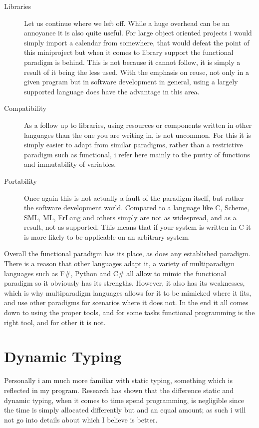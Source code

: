 \documentclass[11pt,a4paper,article,oneside]{memoir}
\begin{document}
\begin{description}
    \item [Libraries]
    Let us continue where we left off.
    While a huge overhead can be an annoyance it is also quite useful.
    For large object oriented projects i would simply import a calendar from somewhere, that would defeat the point of this miniproject but when it comes to library support the functional paradigm is behind.
    This is not because it cannot follow, it is simply a result of it being the less used.
    With the emphasis on reuse, not only in a given program but in software development in general, using a largely supported language does have the advantage in this area.
    \item [Compatibility]
    As a follow up to libraries, using resources or components written in other languages than the one you are writing in, is not uncommon.
    For this it is simply easier to adapt from similar paradigms, rather than a restrictive paradigm such as functional, i refer here mainly to the purity of functions and immutability of variables.
    \item [Portability]
    Once again this is not actually a fault of the paradigm itself, but rather the software development world.
    Compared to a language like C, Scheme, SML, ML, ErLang and others simply are not as widespread, and as a result, not as supported.
    This means that if your system is written in C it is more likely to be applicable on an arbitrary system.
\end{description}

Overall the functional paradigm has its place, as does any established paradigm. 
There is a reason that other languages adapt it, a variety of multiparadigm languages such as F#, Python and C# all allow to mimic the functional paradigm so it obviously has its strengths.
However, it also has its weaknesses, which is why multiparadigm languages allows for it to be mimicked where it fits, and use other paradigms for scenarios where it does not.
In the end it all comes down to using the proper tools, and for some tasks functional programming is the right tool, and for other it is not.

\section{Dynamic Typing}
Personally i am much more familiar with static typing, something which is reflected in my program.
Research has shown that the difference static and dynamic typing, when it comes to time spend programming, is negligible since the time is simply allocated differently but and an equal amount; as such i will not go into details about which I believe is better.
\end{document}
